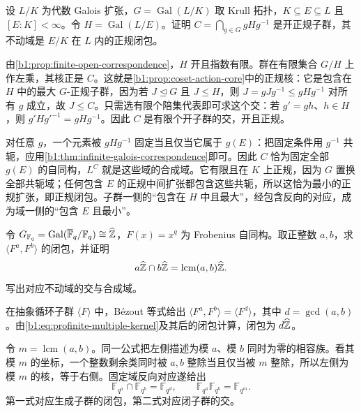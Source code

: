 \begin{exercise}\label{b1:ex:22-10}
	设 \(L/K\) 为代数 Galois 扩张，\(G=\operatorname{Gal}(L/K)\) 取 Krull 拓扑，\(K\subseteq E\subseteq L\) 且 \([E:K]<\infty\)。令 \(H=\operatorname{Gal}(L/E)\)。证明 \(C=\bigcap_{g\in G}gHg^{-1}\) 是开正规子群，其不动域是 \(E/K\) 在 \(L\) 内的正规闭包。
\end{exercise}
\begin{solution}
	由\cref{b1:prop:finite-open-correspondence}，\(H\) 开且指数有限。群在有限集合 \(G/H\) 上作左乘，其核正是 \(C\)。这就是\cref{b1:prop:coset-action-core}中的正规核：它是包含在 \(H\) 中的最大 \(G\)-正规子群，因为若 \(J\trianglelefteq G\) 且 \(J\leq H\)，则 \(J=gJg^{-1}\leq gHg^{-1}\) 对所有 \(g\) 成立，故 \(J\leq C\)。只需选有限个陪集代表即可求这个交：若 \(g'=gh\)、\(h\in H\)，则 \(g'Hg'^{-1}=gHg^{-1}\)。因此 \(C\) 是有限个开子群的交，开且正规。

	对任意 \(g\)，一个元素被 \(gHg^{-1}\) 固定当且仅当它属于 \(g(E)\)：把固定条件用 \(g^{-1}\) 共轭，应用\cref{b1:thm:infinite-galois-correspondence}即可。因此 \(C\) 恰为固定全部 \(g(E)\) 的自同构，\(L^C\) 就是这些域的合成域。它有限且在 \(K\) 上正规，因为 \(G\) 置换全部共轭域；任何包含 \(E\) 的正规中间扩张都包含这些共轭，所以这恰为最小的正规扩张，即正规闭包。子群一侧的“包含在 \(H\) 中且最大”，经包含反向的对应，成为域一侧的“包含 \(E\) 且最小”。
\end{solution}

\begin{exercise}\label{b1:ex:22-11}
	令 \(G_{\mathbb F_q}=\operatorname{Gal}(\overline{\mathbb F}_q/\mathbb F_q)\cong\widehat{\vphantom{Z}\mathbb Z}\)，\(F(x)=x^q\) 为 Frobenius 自同构。取正整数 \(a,b\)，求 \(\langle F^a,F^b\rangle\) 的闭包，并证明
	\[
		a\widehat{\vphantom{Z}\mathbb Z}\cap b\widehat{\vphantom{Z}\mathbb Z} =\operatorname{lcm}(a,b)\widehat{\vphantom{Z}\mathbb Z}.
	\]
	写出对应不动域的交与合成域。
\end{exercise}
\begin{solution}
	在抽象循环子群 \(\langle F\rangle\) 中，Bézout 等式给出 \(\langle F^a,F^b\rangle=\langle F^d\rangle\)，其中 \(d=\gcd(a,b)\)。由\eqref{b1:eq:profinite-multiple-kernel}及其后的闭包计算，闭包为 \(d\widehat{\vphantom{Z}\mathbb Z}\)。

	令 \(m=\operatorname{lcm}(a,b)\)。同一公式把左侧描述为模 \(a\)、模 \(b\) 同时为零的相容族。看其模 \(m\) 的坐标，一个整数剩余类同时被 \(a,b\) 整除当且仅当被 \(m\) 整除，所以左侧为模 \(m\) 的核，等于右侧。固定域反向对应遂给出
	\[
		\mathbb F_{q^a}\cap\mathbb F_{q^b}=\mathbb F_{q^d}, \qquad\mathbb F_{q^a}\mathbb F_{q^b}=\mathbb F_{q^m}.
	\]
	第一式对应生成子群的闭包，第二式对应闭子群的交。
\end{solution}

